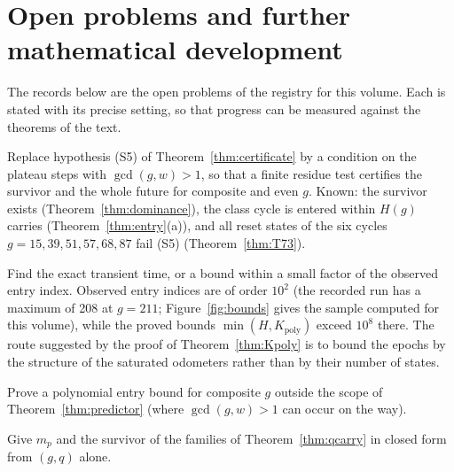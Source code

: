 \chapter{Open problems and further mathematical development}\label{app:open}

The records below are the open problems of the registry for this volume. Each is stated with its precise setting, so that progress can be measured against the theorems of the text.

\begin{problem}\label{op:composite}
Replace hypothesis (S5) of Theorem~\ref{thm:certificate} by a condition on the plateau steps with \(\gcd(g,w)>1\), so that a finite residue test certifies the survivor and the whole future for composite and even \(g\). Known: the survivor exists (Theorem~\ref{thm:dominance}), the class cycle is entered within \(H(g)\) carries (Theorem~\ref{thm:entry}(a)), and all reset states of the six cycles \(g=15,39,51,57,68,87\) fail (S5) (Theorem~\ref{thm:T73}).
\end{problem}

\begin{problem}\label{op:exact}
Find the exact transient time, or a bound within a small factor of the observed entry index. Observed entry indices are of order \(10^2\) (the recorded run has a maximum of 208 at \(g=211\); Figure~\ref{fig:bounds} gives the sample computed for this volume), while the proved bounds \(\min(H,K_{\mathrm{poly}})\) exceed \(10^8\) there. The route suggested by the proof of Theorem~\ref{thm:Kpoly} is to bound the epochs by the structure of the saturated odometers rather than by their number of states.
\end{problem}

\begin{problem}
Prove a polynomial entry bound for composite \(g\) outside the scope of Theorem~\ref{thm:predictor} (where \(\gcd(g,w)>1\) can occur on the way).
\end{problem}

\begin{problem}
Give \(m_p\) and the survivor of the families of Theorem~\ref{thm:qcarry} in closed form from \((g,q)\) alone.
\end{problem}

